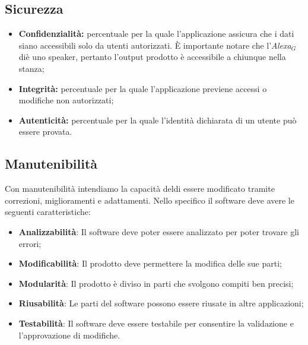 \subsection{Sicurezza}
\begin{itemize}
	\item \textbf{Confidenzialità:} percentuale per la quale l'applicazione assicura che i dati siano accessibili solo da utenti autorizzati. \`{E} importante notare che l'\textit{Alexa$_{G}$} diè uno speaker, pertanto l'output prodotto è accessibile a chiunque nella stanza;
	\item \textbf{Integrità:} percentuale per la quale l'applicazione previene accessi o modifiche non autorizzati;
	\item \textbf{Autenticità:} percentuale per la quale l'identità dichiarata di un utente può essere provata.
\end{itemize}
\subsection{Manutenibilità}
Con manutenibilità intendiamo la capacità deldi essere modificato tramite correzioni, miglioramenti e adattamenti.
Nello specifico il software deve avere le seguenti caratteristiche:
\begin{itemize}
	\item \textbf{Analizzabilità}: Il software deve poter essere analizzato per poter trovare gli errori;
	\item \textbf{Modificabilità}: Il prodotto deve permettere la modifica delle sue parti;
	\item \textbf{Modularità}: Il prodotto è diviso in parti che svolgono compiti ben precisi;
	\item \textbf{Riusabilità}: Le parti del software possono essere riusate in altre applicazioni;
	\item \textbf{Testabilità}: Il software deve essere testabile per consentire la validazione e l'approvazione di modifiche.
\end{itemize}
